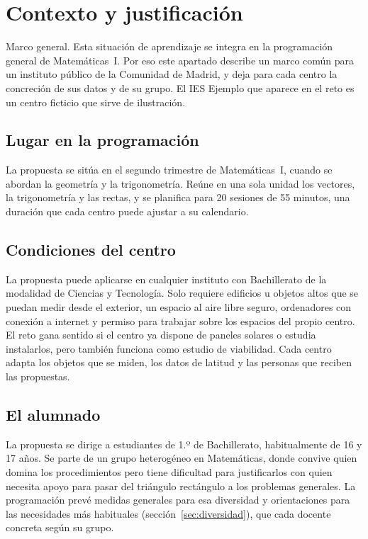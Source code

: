 \section{Contexto y justificación}

\begin{nota}{Marco general.}
Esta situación de aprendizaje se integra en la programación general de Matemáticas~I. Por eso este apartado describe un marco común para un instituto público de la Comunidad de Madrid, y deja para cada centro la concreción de sus datos y de su grupo. El IES Ejemplo que aparece en el reto es un centro ficticio que sirve de ilustración.
\end{nota}

\subsection{Lugar en la programación}
La propuesta se sitúa en el segundo trimestre de Matemáticas~I, cuando se abordan la geometría y la trigonometría. Reúne en una sola unidad los vectores, la trigonometría y las rectas, y se planifica para 20 sesiones de 55 minutos, una duración que cada centro puede ajustar a su calendario.

\subsection{Condiciones del centro}
La propuesta puede aplicarse en cualquier instituto con Bachillerato de la modalidad de Ciencias y Tecnología. Solo requiere edificios u objetos altos que se puedan medir desde el exterior, un espacio al aire libre seguro, ordenadores con conexión a internet y permiso para trabajar sobre los espacios del propio centro. El reto gana sentido si el centro ya dispone de paneles solares o estudia instalarlos, pero también funciona como estudio de viabilidad. Cada centro adapta los objetos que se miden, los datos de latitud y las personas que reciben las propuestas.

\subsection{El alumnado}
La propuesta se dirige a estudiantes de 1.º de Bachillerato, habitualmente de 16 y 17 años. Se parte de un grupo heterogéneo en Matemáticas, donde convive quien domina los procedimientos pero tiene dificultad para justificarlos con quien necesita apoyo para pasar del triángulo rectángulo a los problemas generales. La programación prevé medidas generales para esa diversidad y orientaciones para las necesidades más habituales (sección~\ref{sec:diversidad}), que cada docente concreta según su grupo.

